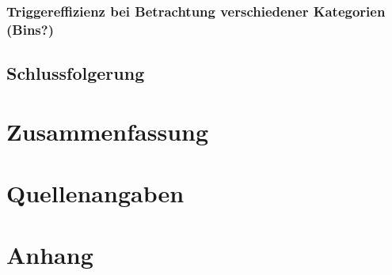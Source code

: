 \documentclass[12pt,a4paper]{article}
\begin{document}
\subsubsection{Triggereffizienz bei Betrachtung verschiedener Kategorien (Bins?)}
\subsection{Schlussfolgerung}
\section{Zusammenfassung}
\section{Quellenangaben}
\section{Anhang}
\end{document}
